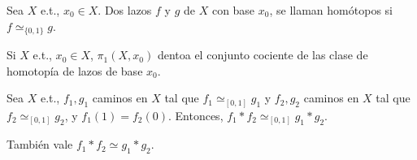 \begin{defn}
  Sea $X$ e.t., $x_{0} \in X$. Dos lazos $f$ y $g$ de $X$ con base $x_{0}$, se llaman homótopos si $f \simeq_{\{ 0, 1 \}} g$.
\end{defn}

\begin{nota}
  Si $X$ e.t., $x_{0} \in X$, $\pi_{1}(X, x_{0})$ dentoa el conjunto cociente de las clase de homotopía de lazos de base $x_{0}$.
\end{nota}

\begin{prop}
  Sea $X$ e.t., $f_{1}, g_{1}$ caminos en $X$ tal que $f_{1} \simeq_{[0, 1 ]} g_{1}$ y $f_{2}, g_{2}$ caminos en $X$ tal que $f_{2} \simeq_{[0, 1 ]} g_{2}$, y $f_{1}(1) = f_{2}(0)$. Entonces, $f_{1} * f_{2} \simeq_{ [0, 1 ]} g_{1} * g_{2}$.
\end{prop}

\begin{obs}
  También vale $f_{1} * f_{2} \simeq g_{1} * g_{2}$.
\end{obs}

